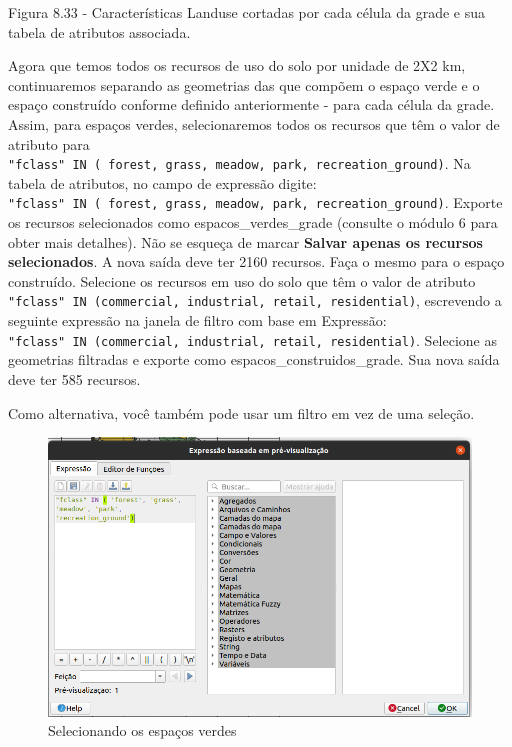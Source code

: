 \documentclass[
]{book}
\begin{document}
Figura 8.33 - Características Landuse cortadas por cada célula da grade e sua tabela de atributos associada.

Agora que temos todos os recursos de uso do solo por unidade de 2X2 km, continuaremos separando as geometrias das que compõem o espaço verde e o espaço construído conforme definido anteriormente - para cada célula da grade. Assim, para espaços verdes, selecionaremos todos os recursos que têm o valor de atributo para \texttt{"fclass"\ IN\ (\ \textquotesingle{}forest\textquotesingle{},\ \textquotesingle{}grass\textquotesingle{},\ \textquotesingle{}meadow\textquotesingle{},\ \textquotesingle{}park\textquotesingle{},\ \textquotesingle{}recreation\_ground\textquotesingle{})}. Na tabela de atributos, no campo de expressão digite: \texttt{"fclass"\ IN\ (\ \textquotesingle{}forest\textquotesingle{},\ \textquotesingle{}grass\textquotesingle{},\ \textquotesingle{}meadow\textquotesingle{},\ \textquotesingle{}park\textquotesingle{},\ \textquotesingle{}recreation\_ground\textquotesingle{})}. Exporte os recursos selecionados como espacos\_verdes\_grade (consulte o módulo 6 para obter mais detalhes). Não se esqueça de marcar \textbf{Salvar apenas os recursos selecionados}. A nova saída deve ter 2160 recursos. Faça o mesmo para o espaço construído. Selecione os recursos em uso do solo que têm o valor de atributo \texttt{"fclass"\ IN\ (\textquotesingle{}commercial\textquotesingle{},\ \textquotesingle{}industrial\textquotesingle{},\ \textquotesingle{}retail\textquotesingle{},\ \textquotesingle{}residential\textquotesingle{})}, escrevendo a seguinte expressão na janela de filtro com base em Expressão: \texttt{"fclass"\ IN\ (\textquotesingle{}commercial\textquotesingle{},\ \textquotesingle{}industrial\textquotesingle{},\ \textquotesingle{}retail\textquotesingle{},\ \textquotesingle{}residential\textquotesingle{})}. Selecione as geometrias filtradas e exporte como espacos\_construidos\_grade. Sua nova saída deve ter 585 recursos.

Como alternativa, você também pode usar um filtro em vez de uma seleção.

\begin{figure}
\centering
\includegraphics{media/modulo8/fig834_a.png}
\caption{Selecionando os espaços verdes}
\end{figure}
\end{document}
